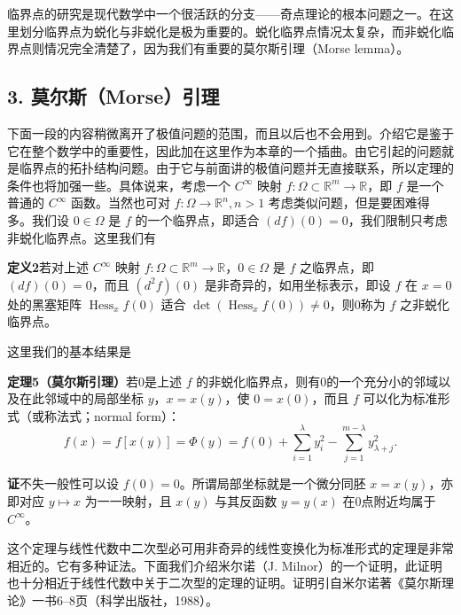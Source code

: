 临界点的研究是现代数学中一个很活跃的分支——奇点理论的根本问题之一。在这里划分临界点为蜕化与非蜕化是极为重要的。蜕化临界点情况太复杂，而非蜕化临界点则情况完全清楚了，因为我们有重要的莫尔斯引理（Morse lemma）。

\subsection*{3. 莫尔斯（Morse）引理}

下面一段的内容稍微离开了极值问题的范围，而且以后也不会用到。介绍它是鉴于它在整个数学中的重要性，因此加在这里作为本章的一个插曲。由它引起的问题就是临界点的拓扑结构问题。由于它与前面讲的极值问题并无直接联系，所以定理的条件也将加强一些。具体说来，考虑一个 $C^\infty$ 映射 $f:\Omega\subset\mathbb R^m\to\mathbb R$，即 $f$ 是一个普通的 $C^\infty$ 函数。当然也可对 $f:\Omega\to\mathbb R^n,n>1$ 考虑类似问题，但是要困难得多。我们设 $0\in\Omega$ 是 $f$ 的一个临界点，即适合 $(df)(0)=0$，我们限制只考虑非蜕化临界点。这里我们有

\noindent\textbf{定义2}\quad 若对上述 $C^\infty$ 映射 $f:\Omega\subset\mathbb R^m\to\mathbb R$，$0\in\Omega$ 是 $f$ 之临界点，即 $(df)(0)=0$，而且 $(d^2f)(0)$ 是非奇异的，如用坐标表示，即设 $f$ 在 $x=0$ 处的黑塞矩阵 $\operatorname{Hess}_x f(0)$ 适合 $\det(\operatorname{Hess}_x f(0))\ne0$，则0称为 $f$ 之非蜕化临界点。

这里我们的基本结果是

\noindent\textbf{定理5（莫尔斯引理）}\quad 若0是上述 $f$ 的非蜕化临界点，则有0的一个充分小的邻域以及在此邻域中的局部坐标 $y$，$x=x(y)$，使 $0=x(0)$，而且 $f$ 可以化为标准形式（或称法式；normal form）：
\begin{equation}
 f(x)=f[x(y)]=\Phi(y)=f(0)+\sum_{i=1}^{\lambda}y_i^2-\sum_{j=1}^{m-\lambda}y_{\lambda+j}^2.
 \tag{18}
\end{equation}

\noindent\textbf{证}\quad 不失一般性可以设 $f(0)=0$。所谓局部坐标就是一个微分同胚 $x=x(y)$，亦即对应 $y\mapsto x$ 为一一映射，且 $x(y)$ 与其反函数 $y=y(x)$ 在0点附近均属于 $C^\infty$。

这个定理与线性代数中二次型必可用非奇异的线性变换化为标准形式的定理是非常相近的。它有多种证法。下面我们介绍米尔诺（J. Milnor）的一个证明，此证明也十分相近于线性代数中关于二次型的定理的证明。证明引自米尔诺著《莫尔斯理论》一书6--8页（科学出版社，1988）。

